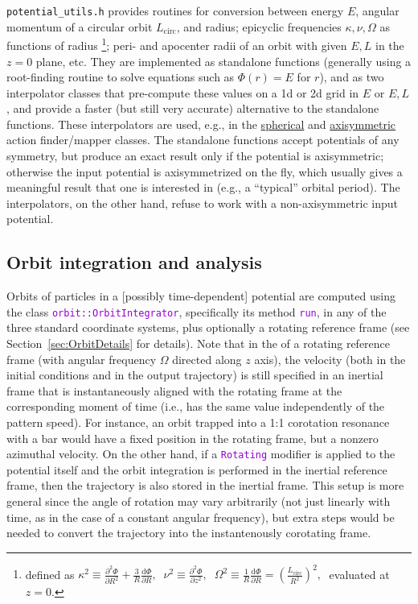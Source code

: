 \documentclass[12pt]{article}
\newcommand{\ttt}[1]{\textcolor{darkviolet}{\texttt{#1}}}
\renewcommand{\d}{\mathrm{d}}
\newcommand{\D}{\partial}
\begin{document}
\texttt{potential_utils.h} provides routines for conversion between energy $E$, angular momentum of a circular orbit $L_\mathrm{circ}$, and radius; epicyclic frequencies $\kappa,\nu,\Omega$ as functions of radius%
\footnote{defined as $\displaystyle \kappa^2\equiv \frac{\D ^2\Phi}{\D R^2} + \frac 3 R \frac{\d\Phi}{\D R},\;\; \nu^2\equiv \frac{\D ^2\Phi}{\D z^2},\;\; \Omega^2\equiv \frac 1 R \frac{\d\Phi}{\D R} = \left(\frac{L_\mathrm{circ}}{R^2}\right)^2,\;$ evaluated at $z=0$.};
peri- and apocenter radii of an orbit with given $E,L$ in the $z=0$ plane, etc. They are implemented as standalone functions (generally using a root-finding routine to solve equations such as $\Phi(r)=E$ for $r$), and as two interpolator classes that pre-compute these values on a 1d or 2d grid in $E$ or $E,L$, and provide a faster (but still very accurate) alternative to the standalone functions. These interpolators are used, e.g., in the \hyperref[sec:ActionsSpherical]{spherical} and \hyperref[sec:ActionsStaeckel]{axisymmetric} action finder/mapper classes. The standalone functions accept potentials of any symmetry, but produce an exact result only if the potential is axisymmetric; otherwise the input potential is axisymmetrized on the fly, which usually gives a meaningful result that one is interested in (e.g., a ``typical'' orbital period). The interpolators, on the other hand, refuse to work with a non-axisymmetric input potential.


\subsection{Orbit integration and analysis}  \label{sec:Orbits}

Orbits of particles in a [possibly time-dependent] potential are computed using the class  \ttt{orbit::OrbitIntegrator}, specifically its method \ttt{run}, in any of the three standard coordinate systems, plus optionally a rotating reference frame (see Section~\ref{sec:OrbitDetails} for details). 
Note that in the of a rotating reference frame (with angular frequency $\Omega$ directed along $z$ axis), the velocity (both in the initial conditions and in the output trajectory) is still specified in an inertial frame that is instantaneously aligned with the rotating frame at the corresponding moment of time (i.e., has the same value independently of the pattern speed). For instance, an orbit trapped into a 1:1 corotation resonance with a bar would have a fixed position in the rotating frame, but a nonzero azimuthal velocity. On the other hand, if a \ttt{Rotating} modifier is applied to the potential itself and the orbit integration is performed in the inertial reference frame, then the trajectory is also stored in the inertial frame. This setup is more general since the angle of rotation may vary arbitrarily (not just linearly with time, as in the case of a constant angular frequency), but extra steps would be needed to convert the trajectory into the instantenously corotating frame.
\end{document}

